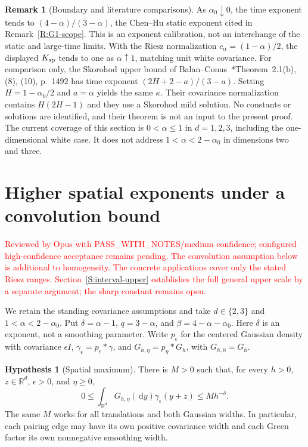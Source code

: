 \documentclass[12pt]{article}
\numberwithin{equation}{section}
\theoremstyle{definition}
\newtheorem{hypothesis}[theorem]{Hypothesis}
\newtheorem{remark}[theorem]{Remark}
\newcommand{\R}{\mathbb{R}}
\newcommand{\ud}{\,\mathrm{d}}
\newcommand{\myCmts}[1]{\begin{framed}\noindent\textcolor{red}{#1}\end{framed}}
\begin{document}
\begin{remark}[Boundary and literature comparisons]\label{R:d1-comparisons}
  As $\alpha_0\downarrow0$, the time exponent tends to
  $(4-\alpha)/(3-\alpha)$, the Chen--Hu static exponent cited in
  Remark~\ref{R:G1-scope}. This is an exponent calibration, not an
  interchange of the static and large-time limits. With the Riesz
  normalization $c_\alpha=(1-\alpha)/2$, the displayed $K_{\rm sp}$
  tends to one as $\alpha\uparrow1$, matching unit white covariance.
  For comparison only, the Skorohod upper bound of
  Balan--Conus~\cite{balan.conus:16:intermittency}*{Theorem~2.1(b),
  (8), (10), p.~1492} has time exponent $(2H+2-a)/(3-a)$.
  Setting $H=1-\alpha_0/2$ and $a=\alpha$ yields the same $\kappa$.
  Their covariance normalization contains $H(2H-1)$ and they use a
  Skorohod mild solution. No constants or solutions are identified,
  and their theorem is not an input to the present proof. The current
  coverage of this section is $0<\alpha\le1$ in $d=1,2,3$, including
  the one-dimensional white case. It does not address
  $1<\alpha<2-\alpha_0$ in dimensions two and three.
\end{remark}

\section{Higher spatial exponents under a convolution bound}
\label{S:higher-alpha}

\myCmts{Reviewed by Opus with PASS\_WITH\_NOTES/medium confidence;
configured high-confidence acceptance remains pending. The convolution
assumption below is additional to homogeneity. The concrete applications
cover only the stated Riesz ranges. Section~\ref{S:interval-upper}
establishes the full general upper scale by a separate argument;
the sharp constant remains open.}

We retain the standing covariance assumptions and take $d\in\{2,3\}$ and
$1<\alpha<2-\alpha_0$. Put $\delta=\alpha-1$, $q=3-\alpha$, and
$\beta=4-\alpha-\alpha_0$. Here $\delta$ is an exponent, not a smoothing
parameter. Write $p_\epsilon$ for the centered Gaussian density with
covariance $\epsilon I$, $\gamma_\epsilon=p_\epsilon*\gamma$, and
$G_{h,\eta}=p_\eta*G_h$, with $G_{h,0}=G_h$.

\begin{hypothesis}[Spatial maximum]\label{H:spatial-maximum}
  There is $M>0$ such that, for every $h>0$, $z\in\R^d$,
  $\epsilon>0$, and $\eta\ge0$,
  \begin{equation}\label{E:higher-convolution}
    0\le\int_{\R^d}G_{h,\eta}(\ud y)\gamma_\epsilon(y+z)
    \le M h^{-\delta}.
  \end{equation}
  The same $M$ works for all translations and both Gaussian widths.
  In particular, each pairing edge may have its own positive covariance
  width and each Green factor its own nonnegative smoothing width.
\end{hypothesis}
\end{document}
